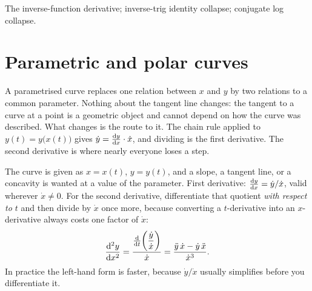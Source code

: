 \begin{seealsob}The inverse-function derivative; inverse-trig identity collapse; conjugate log collapse.\end{seealsob}

\section{Parametric and polar curves}

A parametrised curve replaces one relation between $x$ and $y$ by two relations to a common parameter. Nothing about the tangent line changes: the tangent to a curve at a point is a geometric object and cannot depend on how the curve was described. What changes is the route to it. The chain rule applied to $y(t)=y\bigl(x(t)\bigr)$ gives $\dot y=\frac{\mathrm{d}y}{\mathrm{d}x}\cdot\dot x$, and dividing is the first derivative. The second derivative is where nearly everyone loses a step.

\cue The curve is given as $x=x(t)$, $y=y(t)$, and a slope, a tangent line, or a concavity is wanted at a value of the parameter.
\method First derivative: $\frac{\mathrm{d}y}{\mathrm{d}x}=\dot y/\dot x$, valid wherever $\dot x\neq0$. For the second derivative, differentiate that quotient \emph{with respect to $t$} and then divide by $\dot x$ once more, because converting a $t$-derivative into an $x$-derivative always costs one factor of $\dot x$:
\[
\frac{\mathrm{d}^{2}y}{\mathrm{d}x^{2}}=\frac{\frac{\mathrm{d}}{\mathrm{d}t}\!\left(\dfrac{\dot y}{\dot x}\right)}{\dot x}=\frac{\ddot y\,\dot x-\dot y\,\ddot x}{\dot x^{3}} .
\]
In practice the left-hand form is faster, because $\dot y/\dot x$ usually simplifies before you differentiate it.

